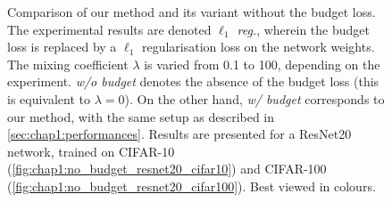 \begin{figure}
  \centering
  \caption{ Comparison of our method and its variant without the budget loss.
    The experimental results are denoted \emph{$\ell_1$ reg.}, wherein the budget
    loss is replaced by a $\ell_1$ regularisation loss on the network weights. The
    mixing coefficient $\lambda$ is varied from 0.1 to 100, depending on the
    experiment. \emph{w/o budget} denotes the absence of the budget loss (this
    is equivalent to $\lambda = 0$). On the other hand, \emph{w/ budget}
    corresponds to our method, with the same setup as described in
    \cref{sec:chap1:performances}. Results are presented for a ResNet20 network,
    trained on CIFAR-10 (\cref{fig:chap1:no_budget_resnet20_cifar10}) and
    CIFAR-100 (\cref{fig:chap1:no_budget_resnet20_cifar100}). Best viewed in
    colours.}
  \label{fig:chap1:no_budget_resnet20}
\end{figure}



